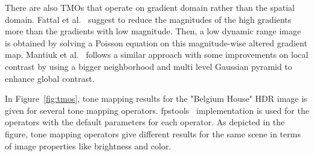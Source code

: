 There are also TMOs that operate on gradient domain rather than the spatial domain. Fattal et al.~\cite{fattal2002gradient} suggest to reduce the magnitudes of the high gradients more than the gradients with low magnitude. Then, a low dynamic range image is obtained by solving a Poisson equation on this magnitude-wise altered gradient map. Mantiuk et al.~\cite{mantiuk2006perceptual} follows a similar approach with some improvements on local contrast by using a bigger neighborhood and multi level Gaussian pyramid to enhance global contrast.

In Figure~\ref{fig:tmos}, tone mapping results for the "Belgium House" HDR image is given for several tone mapping operators. fpstools~\cite{HDRGallery} implementation is used for the operators with the default parameters for each operator. As depicted in the figure, tone mapping operators give different results for the same scene in terms of image properties like brightness and color.


